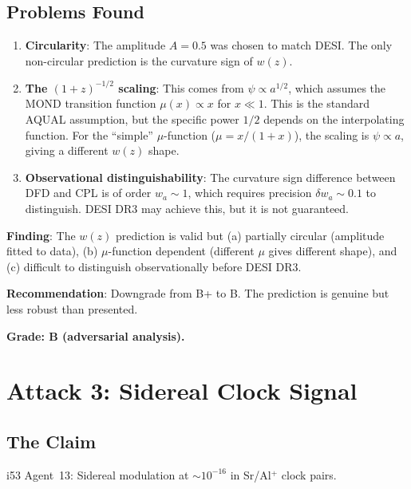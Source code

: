 \documentclass[11pt,a4paper]{article}
\begin{document}
\subsection{Problems Found}

\begin{enumerate}
\item \textbf{Circularity}: The amplitude $A = 0.5$ was chosen to match DESI. The only non-circular prediction is the curvature sign of $w(z)$.

\item \textbf{The $(1+z)^{-1/2}$ scaling}: This comes from $\psi \propto a^{1/2}$, which assumes the MOND transition function $\mu(x) \propto x$ for $x \ll 1$. This is the standard AQUAL assumption, but the specific power $1/2$ depends on the interpolating function. For the ``simple'' $\mu$-function ($\mu = x/(1+x)$), the scaling is $\psi \propto a$, giving a different $w(z)$ shape.

\item \textbf{Observational distinguishability}: The curvature sign difference between DFD and CPL is of order $w_a \sim 1$, which requires precision $\delta w_a \sim 0.1$ to distinguish. DESI DR3 may achieve this, but it is not guaranteed.
\end{enumerate}

\begin{tcolorbox}[colback=yellow!5!white, colframe=yellow!60!black, title={Agent 14: $w(z)$ Assessment}]
\textbf{Finding}: The $w(z)$ prediction is valid but (a) partially circular (amplitude fitted to data), (b) $\mu$-function dependent (different $\mu$ gives different shape), and (c) difficult to distinguish observationally before DESI DR3.

\textbf{Recommendation}: Downgrade from B+ to B. The prediction is genuine but less robust than presented.

\textbf{Grade: B (adversarial analysis).}
\end{tcolorbox}

\section{Attack 3: Sidereal Clock Signal}

\subsection{The Claim}

i53 Agent~13: Sidereal modulation at $\sim 10^{-16}$ in Sr/Al$^+$ clock pairs.
\end{document}
